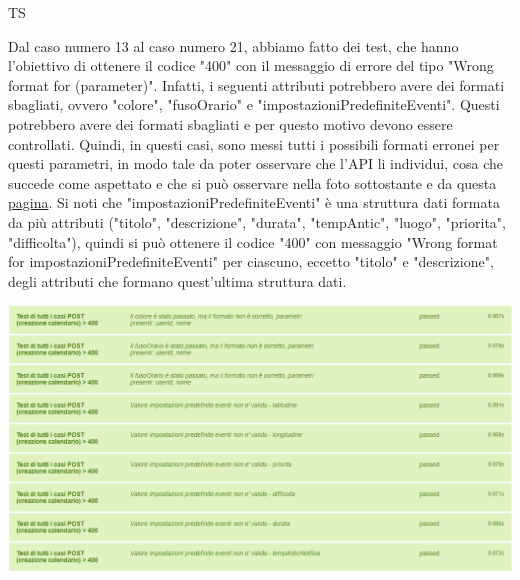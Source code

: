 \begin{listaPersonale}{TS}
\begin{center}
                \end{center}
                Dal caso numero 13 al caso numero 21, abbiamo fatto dei test, che hanno l'obiettivo di ottenere il codice "400" con il messaggio di errore del tipo "Wrong format for (parameter)". Infatti, i seguenti attributi potrebbero avere dei formati sbagliati, ovvero "colore", "fusoOrario" e "impostazioniPredefiniteEventi". Questi potrebbero avere dei formati sbagliati e per questo motivo devono essere controllati. Quindi, in questi casi, sono messi tutti i possibili formati erronei per questi parametri, in modo tale da poter osservare che l'API li individui, cosa che succede come aspettato e che si può osservare nella foto sottostante e da questa \href{https://plan-it.it/test-report.html} {pagina}. Si noti che "impostazioniPredefiniteEventi" è una struttura dati formata da più attributi ("titolo", "descrizione", "durata", "tempAntic", "luogo", "priorita", "difficolta"), quindi si può ottenere il codice "400" con messaggio "Wrong format for impostazioniPredefiniteEventi" per ciascuno, eccetto "titolo" e "descrizione", degli attributi che formano quest'ultima struttura dati.
                \begin{center}
                        \includegraphics[width=1\textwidth, height=0.35\textheight]{img/png/tests/CalendarioPost/400_wrongFormat_PostCalendario.png}

\end{center}
\end{listaPersonale}
